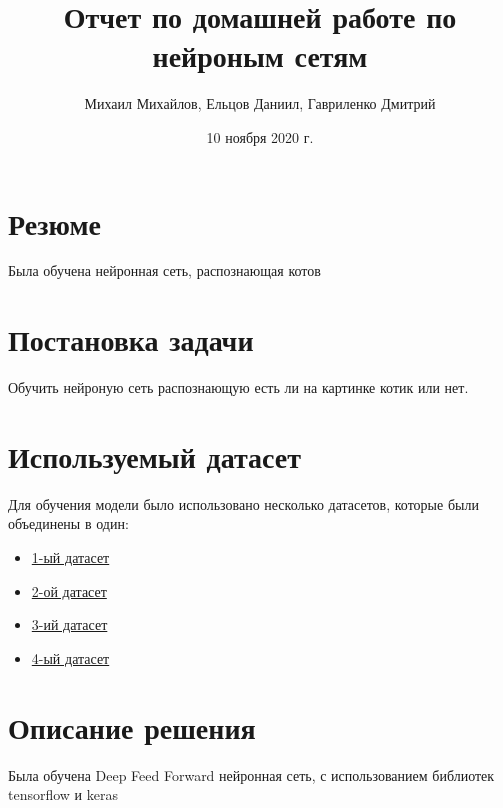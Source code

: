\documentclass{article}
\title{Отчет по домашней работе по нейроным сетям}
\author{Михаил Михайлов, Ельцов Даниил, Гавриленко Дмитрий}
\date{10 ноября 2020 г.}
\begin{document}
\maketitle
\tableofcontents

\section*{Резюме}
Была обучена нейронная сеть, распознающая котов
\newpage
\section{Постановка задачи}
Обучить нейроную сеть распознающую есть ли на картинке котик или нет.

\section{Используемый датасет}
Для обучения модели было использовано несколько датасетов, которые были объединены в один:

\begin{itemize}
    \item \href{https://storage.googleapis.com/openimages/web/extended.html}{1-ый датасет}
    \item \href{https://www.kaggle.com/alessiocorrado99/animals10}{2-ой датасет}
    \item \href{https://www.kaggle.com/zippyz/cats-and-dogs-breeds-classification-oxford-dataset}{3-ий датасет}
    \item \href{https://www.kaggle.com/crawford/cat-dataset}{4-ый датасет}
\end{itemize}

\section{Описание решения}
Была обучена Deep Feed Forward нейронная сеть, с использованием библиотек tensorflow и keras
    
\end{document}
